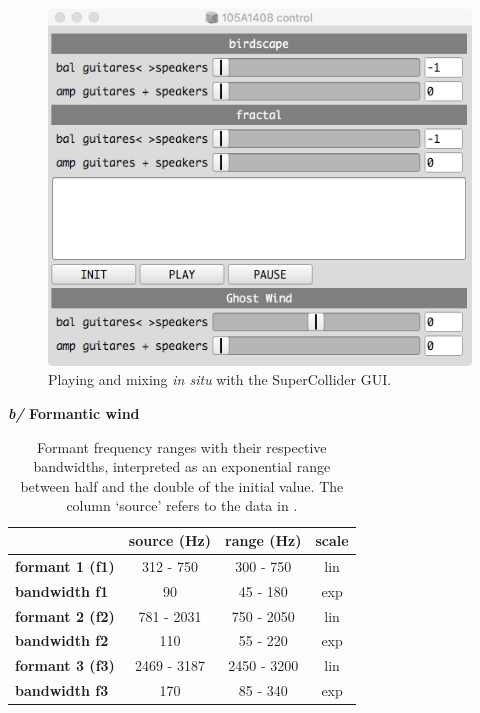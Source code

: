 \begin{figure}[h!]
\begin{center}
	\includegraphics[scale=0.5]{img/9809}		
\caption{Playing and mixing \textit{in situ} with the SuperCollider GUI.}
\label{hk}
\end{center}
\end{figure}

\newpage

  \textbf{\textit{b/} Formantic wind}
  
  \smallskip 
  
  \begin{table}[H]
\begin{center}
{\ttfamily
\begin{tabular}{|l|c|c|c|}
\cline{2-4}
    \multicolumn{1}{c|}{} & \textbf{source (Hz)} & \textbf{range (Hz)} & \textbf{scale} \\ 
    \hline 
    \textbf{formant 1 (f1)} & 312 - 750 & 300 - 750 & lin \\ 
 \hline
 \textbf{bandwidth f1} & 90 & 45 - 180 & exp \\ 
 \hline
 \textbf{formant 2 (f2)} & 781 - 2031 & 750 - 2050 & lin \\ 
 \hline
 \textbf{bandwidth f2} & 110 & 55 - 220 & exp \\ 
 \hline
 \textbf{formant 3 (f3)} & 2469 - 3187 & 2450 - 3200 & lin \\ 
 \hline
 \textbf{bandwidth f3} & 170 & 85 - 340 & exp \\ 
 \hline
\end{tabular}}
\caption{Formant frequency ranges with their respective bandwidths, interpreted as an exponential range between half and the double of the initial value. The column `source' refers to the data in \citep{adc}.}
\end{center}
\label{default}
\end{table}%

	
	
	
	

